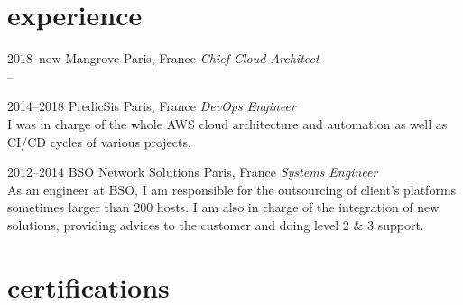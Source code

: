 \documentclass[print]{cv-a4}
\begin{document}

\section{experience}

\begin{entrylist}


\entry
{2018--now}
{Mangrove}
{Paris, France}
{\emph{Chief Cloud Architect} \\
--}

\entry
{2014--2018}
{PredicSis}
{Paris, France}
{\emph{DevOps Engineer} \\
I was in charge of the whole AWS cloud architecture and automation as well as CI/CD cycles of various projects.}

\entry
{2012--2014}
{BSO Network Solutions}
{Paris, France}
{\emph{Systems Engineer} \\
As an engineer at BSO, I am responsible for the outsourcing of client's platforms sometimes larger than 200 hosts. I am also in charge of the integration of new solutions, providing advices to the customer and doing level 2 \& 3 support.}


\end{entrylist}


\section{certifications}
\end{document}
